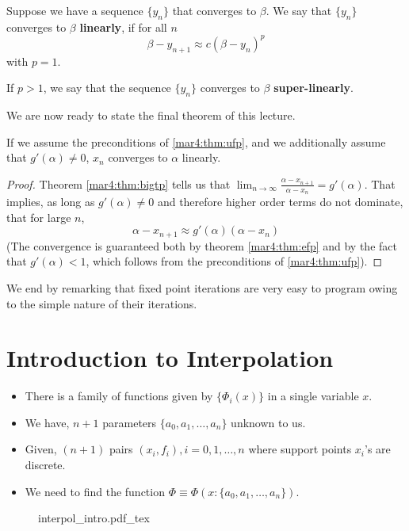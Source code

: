 \begin{defn}
	Suppose we have a sequence $\{y_n \}$ that converges to $\beta$. We say that $\{y_n \}$ converges to $\beta$ \textbf{linearly}, if for all $n$
	\[
		\beta - y_{n+1} \approx c(\beta - y_n)^p
	\]
	with $p = 1$.

	If $p > 1$, we say that the sequence $\{y_n \}$ converges to $\beta$ \textbf{super-linearly}.
\end{defn}
We are now ready to state the final theorem of this lecture.
\begin{thm}
	If we assume the preconditions of \ref{mar4:thm:ufp}, and we additionally assume that $g'(\alpha) \neq 0$, $x_n$ converges to $\alpha$ linearly.
\end{thm}
\begin{proof}
	Theorem \ref{mar4:thm:bigtp} tells us that $\lim_{n\to\infty} \frac{\alpha - x_{n+1}}{\alpha - x_n} = g'(\alpha)$. That implies, as long as $g'(\alpha) \neq 0$ and therefore higher order terms do not dominate, that for large $n$,
	\[
		\alpha - x_{n+1} \approx g'(\alpha)(\alpha - x_n)
	\]
	(The convergence is guaranteed both by theorem \ref{mar4:thm:efp} and by the fact that $g'(\alpha) < 1$, which follows from the preconditions of \ref{mar4:thm:ufp}).
	\hfill
\end{proof}

We end by remarking that fixed point iterations are very easy to program owing to the simple nature of their iterations.

\section{Introduction to Interpolation}
\begin{itemize}
	\item There is a family of functions given by $ \{\Phi_i(x)\} $ in a single variable $ x $.
	\item We have, $ n+1 $ parameters $ \{a_0,a_1,\ldots,a_n\} $ unknown to us.
	\item Given, $ (n+1) $ pairs $ (x_i,f_i), i=0,1,\ldots,n $  where support points $ x_i $'s are discrete.
	\item We need to find the function $ \Phi \equiv \Phi(x: \{a_0,a_1,\ldots,a_n\}) $.
\end{itemize}

\begin{figure}[H]
	\centering
	\def\svgwidth{0.8\textwidth}
	{interpol_intro.pdf_tex}
	\caption{}
	\label{fig1:mar4}
\end{figure}

